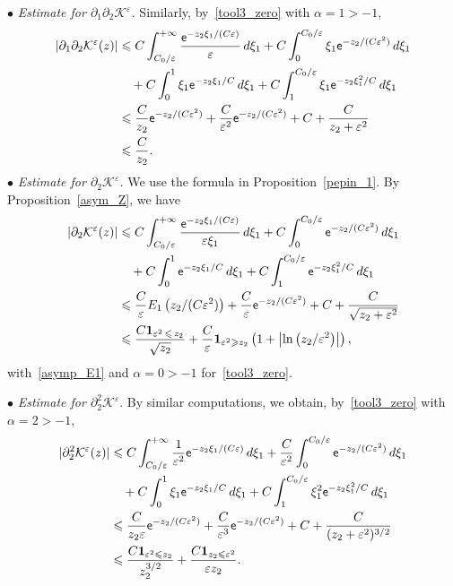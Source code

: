 \documentclass[10pt]{amsart}
\theoremstyle{definition}\newtheorem{defi}[theo]{Definition}\newtheorem{rema}[theo]{Remark}\newtheorem{exam}[theo]{Example}\newtheorem{exem}[theo]{Example}\newtheorem{nota}[theo]{Notation}
\newcommand*\p{\partial}
\newcommand*\BK{\mathcal{K}}
\newcommand{\bfun}{\mathbf{1}}
\newcommand*\ex{{\sf e}}
\newcommand*\ii{\infty}
\newcommand*\gs{\geqslant }
\newcommand*\ls{\leqslant }
\newcommand*\e{\varepsilon}
\begin{document}
\noindent $ \bullet $ \emph{Estimate for $ \p_1 \p_2 \BK^\e $.} Similarly, by~\eqref{tool3_zero} with $ \alpha = 1 > - 1 $,
\begin{align*}
\left\lvert \p_1 \p_2 \BK^\e (z)\right\rvert &
\ls C \int_{C_0/ \e }^{+\ii}
\frac{ \ex^{- z_2 \xi_1/ (C \e)} }{ \e } \, d\xi_1 + C \int_0^{ C_0 /\e} \xi_1 \ex^{- z_2 / (C \e^2) } \, d\xi_1
\\ & \quad + C \int_0^{1} \xi_1 \ex^{- z_2 \xi_1 / C } \, d\xi_1 + C \int_1^{ C_0 / \e } \xi_1 \ex^{- z_2 \xi_1^2 / C } \, d\xi_1
\\ &
\ls \frac{C}{z_2} \ex^{- z_2 / (C \e^2) } + \frac{C}{\e^2} \ex^{- z_2 / (C \e^2) } + C + \frac{C}{ z_2 + \e^2}
\\ &
\ls \frac{C}{ z_2 }.
\end{align*}
$ \bullet $ \emph{Estimate for $ \p_2 \BK^\e $.} We use the formula in Proposition~\ref{pepin_1}. By Proposition~\ref{asym_Z}, we have
\begin{align*}
\left\lvert \p_2 \BK^\e (z) \right\rvert &
\ls C \int_{ C_0 /\e }^{+\ii}
\frac{ \ex^{- z_2 \xi_1/ (C \e)} }{\e \xi_1 } \, d\xi_1 + C \int_0^{ C_0/ \e } \ex^{- z_2 / (C \e^2) } \, d\xi_1
\\ & \quad + C \int_0^{1} \ex^{- z_2 \xi_1 / C } \, d\xi_1 + C \int_1^{ C_0 /\e} \ex^{- z_2 \xi_1^2 / C } \, d\xi_1
\\&
\ls \frac{C}{ \e } E_1 \left(z_2 / (C \e^2) \right) + \frac{ C}{\e} \ex^{- z_2 / (C \e^2) } + C + \frac{C}{\sqrt{z_2 + \e^2 } }
\\ &
\ls \frac{C \bfun_{\e^2\,\ls\,z_2} }{\sqrt{z_2 }} + \frac{C}{\e} \bfun_{\e^2 \gs z_2} \left(1 + \left\lvert \ln\left(z_2 / \e^2\right) \right\rvert\right),
\end{align*}
with~\eqref{asymp_E1} and $ \alpha= 0 > -1 $ for~\eqref{tool3_zero}.
\vspace*{4pt}

\noindent $ \bullet $ \emph{Estimate for $ \p_2^2 \BK^\e $}. By similar computations, we obtain, by~\eqref{tool3_zero} with $ \alpha = 2 > - 1 $,
\begin{align*}
\lvert \p_2^2 \BK^\e (z) \rvert &
\ls C \int_{C_0/ \e}^{+\ii}
\frac{ 1 }{ \e^2 } \ex^{- z_2 \xi_1/ (C \e)} \, d\xi_1 + \frac{ C}{\e^2} \int_0^{ C_0 /\e } \ex^{- z_2 / (C \e^2) } \, d\xi_1
\\ & \quad + C \int_0^{1} \xi_1 \ex^{- z_2 \xi_1 / C } \, d\xi_1 + C \int_1^{ C_0 /\e } \xi_1^2 \ex^{- z_2 \xi_1^2 / C } \, d\xi_1
\\ &
\ls \frac{C}{z_2 \e} \ex^{- z_2 / (C \e^2) } + \frac{C}{\e^3} \ex^{- z_2 / (C \e^2) } + C + \frac{C}{(z_2 + \e^2)^{3/2}}
\\ &
\ls \frac{C \bfun_{\e^2 \ls z_2} }{ z_2^{3/2} } + \frac{C \bfun_{ z_2 \ls \e^2 } }{\e z_2}.
\end{align*}
\end{document}
